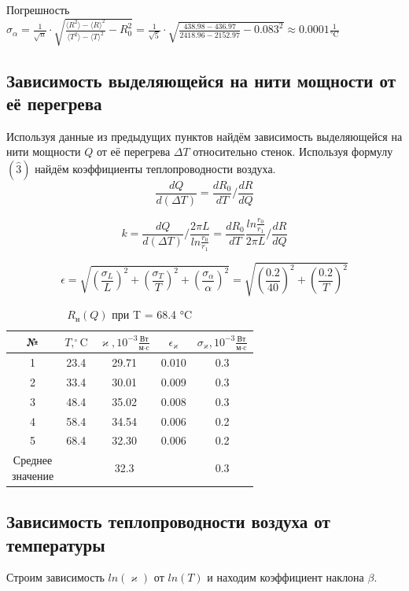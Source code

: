 \documentclass[a4paper, 10pt, twocolumn]{article}
\begin{document}
    Погрешность $\sigma_\alpha = \frac{1}{\sqrt{n}}\cdot \sqrt{\frac{\langle R^2 \rangle - \langle R \rangle ^2}{\langle T^2 \rangle - \langle T \rangle ^2} - R_0^2} = 
    \frac{1}{\sqrt{5}}\cdot\sqrt{\frac{438.98 - 436.97}{2418.96 - 2152.97} - 0.083^2} \approx 0.0001 \frac{1}{\text{°C}}$
    \subsection{Зависимость выделяющейся на нити мощности от её перегрева}

    Используя данные из предыдущих пунктов найдём зависимость выделяющейся на нити мощности $Q$ от её
     перегрева $\Delta T$ относительно стенок. Используя формулу $(\widehat{3})$ найдём коэффициенты
      теплопроводности воздуха.
    $$\frac{dQ}{d(\Delta T)} = \frac{dR_0}{dT} / \frac{dR}{dQ}$$

    $$k = \frac{dQ}{d(\Delta T)} / \frac{2 \pi L}{ln \frac{r_0}{r_1}} = \frac{dR_0}{dT} \frac{ln \frac{r_0}{r_1}}{2 \pi L} / \frac{dR}{dQ}$$

    $$\epsilon = \sqrt{ \left( \frac{\sigma_L}{L} \right)^2  + \left( \frac{\sigma_T}{T} \right)^2 + 
    \left( \frac{\sigma_\alpha}{\alpha}\right)^2} = \sqrt{\left( \frac{0.2}{40} \right)^2 + \left( \frac{0.2}{T} \right)^2}$$
    \begin{table}[H]
        \centering
        \begin{tabular}{|c|c|c|c|c|} \hline
        № & $T, ^\circ\text{C} $ & $\varkappa, 10^{-3}\frac{\text{Вт}}{\text{м} \cdot \text{c}}$ & $ \epsilon_\varkappa $ & $ \sigma_\varkappa, 10^{-3}\frac{\text{Вт}}{\text{м} \cdot \text{c}} $\\ \hline
        1 & 23.4 & 29.71 & 0.010 & 0.3 \\ \hline
        2 & 33.4 & 30.01 & 0.009 & 0.3 \\ \hline
        3 & 48.4 & 35.02 & 0.008 & 0.3 \\ \hline
        4 & 58.4 & 34.54 & 0.006 & 0.2 \\ \hline
        5 & 68.4 & 32.30 & 0.006 & 0.2 \\ \hline
        \shortstack{Среднее \\ значение} & & 32.3 & & 0.3 \\ \hline
        \end{tabular}
        \caption{$R_\text{н}(Q)$ при T = 68.4 °C}
    \end{table}
    \subsection{Зависимость теплопроводности воздуха от температуры}
    Строим зависимость $ln(\varkappa)$ от $ln(T)$ и находим коэффициент наклона $\beta$.
\end{document}
